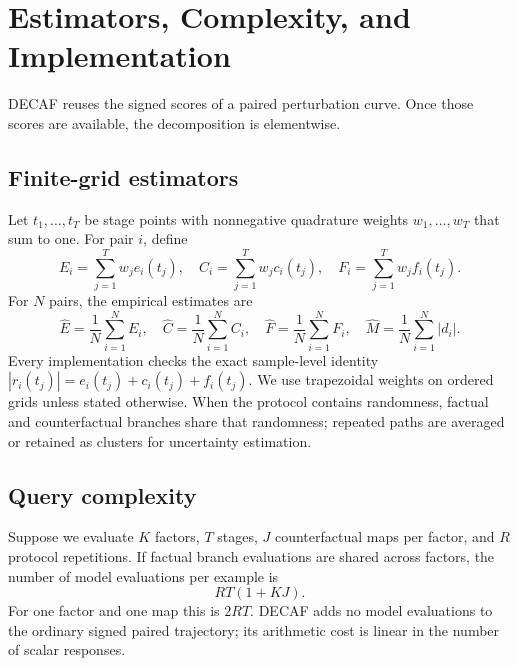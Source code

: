 \section{Estimators, Complexity, and Implementation}
\label{app:estimators}

DECAF reuses the signed scores of a paired perturbation curve. Once those scores are available, the decomposition is elementwise.

\subsection{Finite-grid estimators}

Let $t_1,\ldots,t_T$ be stage points with nonnegative quadrature weights $w_1,\ldots,w_T$ that sum to one. For pair $i$, define
\begin{equation}
    E_i=\sum_{j=1}^{T}w_j e_i(t_j),
    \quad
    C_i=\sum_{j=1}^{T}w_j c_i(t_j),
    \quad
    F_i=\sum_{j=1}^{T}w_j f_i(t_j).
\end{equation}
For $N$ pairs, the empirical estimates are
\begin{equation}
    \widehat E=\frac1N\sum_{i=1}^{N}E_i,
    \quad
    \widehat C=\frac1N\sum_{i=1}^{N}C_i,
    \quad
    \widehat F=\frac1N\sum_{i=1}^{N}F_i,
    \quad
    \widehat M=\frac1N\sum_{i=1}^{N}|d_i|.
    \label{eq:finite-estimator}
\end{equation}
Every implementation checks the exact sample-level identity $|r_i(t_j)|=e_i(t_j)+c_i(t_j)+f_i(t_j)$. We use trapezoidal weights on ordered grids unless stated otherwise. When the protocol contains randomness, factual and counterfactual branches share that randomness; repeated paths are averaged or retained as clusters for uncertainty estimation.

\subsection{Query complexity}
\label{app:complexity}

Suppose we evaluate $K$ factors, $T$ stages, $J$ counterfactual maps per factor, and $R$ protocol repetitions. If factual branch evaluations are shared across factors, the number of model evaluations per example is
\begin{equation}
    RT(1+KJ).
    \label{eq:query-complexity}
\end{equation}
For one factor and one map this is $2RT$. DECAF adds no model evaluations to the ordinary signed paired trajectory; its arithmetic cost is linear in the number of scalar responses.

